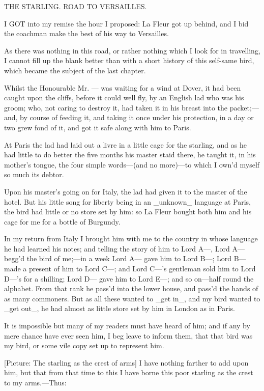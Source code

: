 \documentclass[twoside]{article}
\begin{document}
THE STARLING.
ROAD TO VERSAILLES.


I GOT into my remise the hour I proposed: La Fleur got up behind, and I
bid the coachman make the best of his way to Versailles.

As there was nothing in this road, or rather nothing which I look for in
travelling, I cannot fill up the blank better than with a short history
of this self-same bird, which became the subject of the last chapter.

Whilst the Honourable Mr. — was waiting for a wind at Dover, it had been
caught upon the cliffs, before it could well fly, by an English lad who
was his groom; who, not caring to destroy it, had taken it in his breast
into the packet;—and, by course of feeding it, and taking it once under
his protection, in a day or two grew fond of it, and got it safe along
with him to Paris.

At Paris the lad had laid out a livre in a little cage for the starling,
and as he had little to do better the five months his master staid there,
he taught it, in his mother’s tongue, the four simple words—(and no
more)—to which I own’d myself so much its debtor.

Upon his master’s going on for Italy, the lad had given it to the master
of the hotel.  But his little song for liberty being in an _unknown_
language at Paris, the bird had little or no store set by him: so La
Fleur bought both him and his cage for me for a bottle of Burgundy.

In my return from Italy I brought him with me to the country in whose
language he had learned his notes; and telling the story of him to Lord
A—, Lord A— begg’d the bird of me;—in a week Lord A— gave him to Lord B—;
Lord B— made a present of him to Lord C—; and Lord C—’s gentleman sold
him to Lord D—’s for a shilling; Lord D— gave him to Lord E—; and so
on—half round the alphabet.  From that rank he pass’d into the lower
house, and pass’d the hands of as many commoners.  But as all these
wanted to _get in_, and my bird wanted to _get out_, he had almost as
little store set by him in London as in Paris.

It is impossible but many of my readers must have heard of him; and if
any by mere chance have ever seen him, I beg leave to inform them, that
that bird was my bird, or some vile copy set up to represent him.

[Picture: The starling as the crest of arms] I have nothing farther to
add upon him, but that from that time to this I have borne this poor
starling as the crest to my arms.—Thus:
\end{document}
